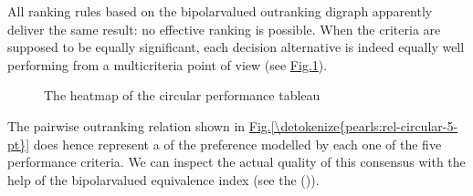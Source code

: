 \documentclass[a4paper,12pt,english]{sphinxhowto}
\let\sphinxpxdimen\pdfpxdimen\else\newdimen\sphinxpxdimen
\begin{document}
\sphinxAtStartPar
All ranking rules based on the bipolar\sphinxhyphen{}valued outranking digraph apparently deliver the same result: no effective ranking is possible. When the criteria are supposed to be equally significant, each decision alternative is indeed equally well performing from a multicriteria point of view (see \hyperref[\detokenize{pearls:circularheatmap}]{Fig.\@ \ref{\detokenize{pearls:circularheatmap}}}).

\begin{sphinxVerbatim}[commandchars=\\\{\},numbers=left,firstnumber=1,stepnumber=1]
                        
       
\end{sphinxVerbatim}

\begin{figure}[H]
\centering
\capstart

\noindent\sphinxincludegraphics[width=400\sphinxpxdimen]{{circularHeatmap}.png}
\caption{The heatmap of the circular performance tableau}\label{\detokenize{pearls:circularheatmap}}\end{figure}

\sphinxAtStartPar
The pairwise outranking relation shown in \hyperref[\detokenize{pearls:rel-circular-5-pt}]{Fig.\@ \ref{\detokenize{pearls:rel-circular-5-pt}}} does hence represent a  of the preference modelled by each one of the five performance criteria. We can inspect the actual quality of this consensus with the help of the bipolar\sphinxhyphen{}valued equivalence index (see the {\hyperref[\detokenize{pearls:ordinalcorrelation-tutorial-label}]{}} ()).
\end{document}
